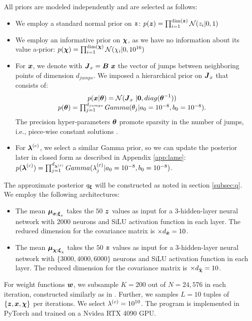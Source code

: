 All priors are modeled independently and are selected as follows:
\begin{itemize}
    \item We employ a standard normal prior on $\boldsymbol{z}$: $p(\boldsymbol{z}) = \prod_{i=1}^{\dim(\boldsymbol{z})} \mathcal{N}(z_i| 0, 1)$
    \item We employ an informative prior on $\boldsymbol{\chi}$, as we have no information about its value a-prior: $p(\boldsymbol{\chi}) = \prod_{i=1}^{\dim(\boldsymbol{\chi})} \mathcal{N}(\chi_i| 0, 10^{16})$
    \item For $\boldsymbol{x}$, we denote with $\boldsymbol{J}_x=\boldsymbol{B~x}$ the vector of jumps between neighboring points of dimension $d_{jumps}$. We imposed a hierarchical prior on $\boldsymbol{J}_x$ that consists of:
    \begin{equation}
        \label{eqn:jump_prior}
        \begin{array}{c}
        p(\boldsymbol{x}| \boldsymbol{\theta})=\mathcal{N}( \boldsymbol{J}_x ~|\boldsymbol{0}, diag(\boldsymbol{\theta}^{-1})) \\
        p(\boldsymbol{\theta}) =\prod_{j=1}^{d_{jumps}} Gamma(\theta_j | a_0 = 10^{-8},b_0 = 10^{-8}).
        \end{array}
    \end{equation}
    The precision hyper-parameters $\boldsymbol{\theta}$ promote sparsity in the number of jumps, i.e., piece-wise constant solutions \cite{bardsley2013gaussian}.
    \item For $\boldsymbol{\lambda}^{(c)}$, we select a similar Gamma prior, so we can update the posterior later in closed form as described in Appendix \ref{app:lame}: $p(\boldsymbol{\lambda}^{(c)}) =\prod_{j=1}^{d_{\boldsymbol{\lambda}^{(c)}}} Gamma(\lambda^{(c)}_j | a_0 = 10^{-8},b_0 = 10^{-8})$.
\end{itemize}

The approximate posterior $q_{\boldsymbol{\xi}}$ will be constructed as noted in section \ref{subsec:q}. We employ the following architectures:
\begin{itemize}
    \item The mean $\boldsymbol{\mu}_{\boldsymbol{x};\boldsymbol{\xi}_x}$ takes the $50$ $\boldsymbol{z}$ values as input for a 3-hidden-layer neural network with $2000$ neurons and SiLU activation function in each layer. The reduced dimension for the covariance matrix is $\times d_{\tilde{\boldsymbol{x}}}=10$.
    \item The mean $\boldsymbol{\mu}_{\boldsymbol{\chi};\boldsymbol{\xi}_\chi}$ takes the $50$ $\boldsymbol{z}$ values as input for a 3-hidden-layer neural network with $\{ 3000, 4000, 6000 \}$ neurons and SiLU activation function in each layer. The reduced dimension for the covariance matrix is $\times d_{\tilde{\boldsymbol{\chi}}}=10$. 
\end{itemize}
For weight functions $\boldsymbol{w}$, we subsample $K=200$ out of $N=24,576$ in each iteration, constructed similarly as in \cite{scholz2025weak}. Further, we samples $L=10$ tuples of $\{ \boldsymbol{z}, \boldsymbol{x}, \boldsymbol{\chi} \}$ per iterations. We select $\lambda^{(e)} = 10^{10}$. The program is implemented in PyTorch and trained on a Nvidea RTX 4090 GPU.

